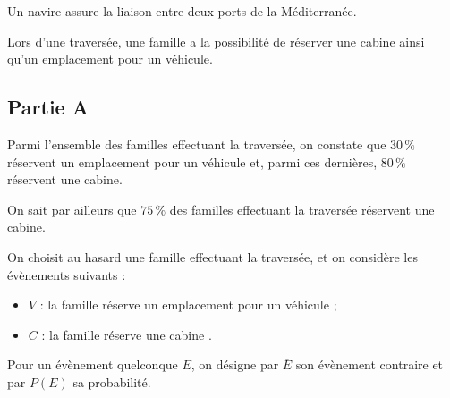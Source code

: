 Un navire assure la liaison entre deux ports de la Méditerranée.

	Lors d'une traversée, une famille a la possibilité de réserver une cabine ainsi qu'un emplacement pour un véhicule.

	\subsection*{Partie A}

	Parmi l'ensemble des familles effectuant la traversée, on constate que $30\,\%$ réservent un emplacement pour un véhicule et, parmi ces dernières, $80\,\%$ réservent une cabine.

	On sait par ailleurs que $75\,\%$ des familles effectuant la traversée réservent une cabine.

	\medskip

	On choisit au hasard une famille effectuant la traversée, et on considère les évènements suivants :

	\begin{itemize}[label={\textbullet~}]
		\item $V$ : \og  la famille réserve un emplacement pour un véhicule \fg{};

		\item $C$ : \og  la famille réserve une cabine \fg{} .
	\end{itemize}

	Pour un évènement quelconque $E$, on désigne par $\overline{E}$ son évènement contraire et par $P(E)$ sa probabilité.

